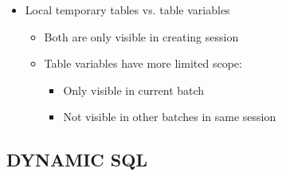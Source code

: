\documentclass{report}
\begin{document}
\begin{itemize}
\begin{itemize}
\begin{itemize}
                \end{itemize}
            \end{itemize}
        \item Local temporary tables vs. table variables
            \begin{itemize} 
                \item Both are only visible in creating session
                \item Table variables have more limited scope:
                \begin{itemize} 
                    \item Only visible in current batch
                    \item Not visible in other batches in same session
                \end{itemize}
            \end{itemize}
    \end{itemize}

    \subsection{DYNAMIC SQL}
\end{document}
